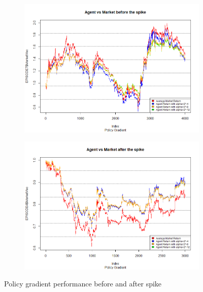 \documentclass[a4paper,12pt]{article}
\begin{document}
\begin{figure}[h!]
  \centering
  \begin{subfigure}[b]{0.4\linewidth}
    \includegraphics[width=\linewidth]{figures/agt_vs_mkt_before_spike_pg.png}
  \end{subfigure}
  \begin{subfigure}[b]{0.4\linewidth}
    \includegraphics[width=\linewidth]{figures/agt_vs_mkt_after_spike_pg.png}
  \end{subfigure}
  \caption{Policy gradient performance before and after spike}
  \label{fig:pg_spike}
\end{figure}
\end{document}
